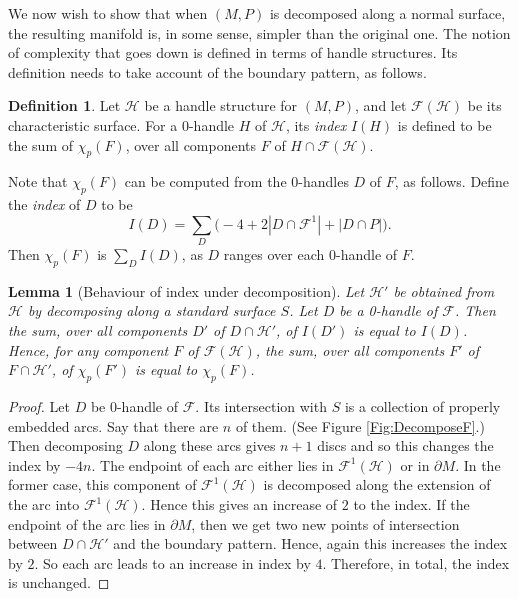 \documentclass[oneside]{amsart}
\numberwithin{equation}{section}
\theoremstyle{plain}
\newtheorem{lemma}[equation]{Lemma}
\theoremstyle{definition}
\newtheorem{definition}[equation]{Definition}
\newcommand{\calF}{\mathcal{F}}
\begin{document}
We now wish to show that when $(M,P)$ is decomposed along a normal surface, the resulting manifold is, in some sense, simpler than the original one. The notion of complexity that goes down is defined in terms of handle structures. Its definition needs to take account of the boundary pattern, as follows.

\begin{definition}
\label{Def:Index}
Let $\mathcal{H}$ be a handle structure for $(M,P)$, and let $\mathcal{F}(\mathcal{H})$ be its characteristic surface.
For a 0-handle $H$ of $\mathcal{H}$, its \emph{index} $I(H)$ is defined to be the sum of $\chi_p(F)$, over all components $F$ of $H \cap \mathcal{F}(\mathcal{H})$.
\end{definition}

Note that $\chi_p(F)$ can be computed from the 0-handles $D$ of $F$, as follows. 
Define the \emph{index} of $D$ to be 
$$I(D) = \sum_D \bigl( -4 + 2|D \cap \mathcal{F}^1| + |D \cap P| \bigr ).$$
Then $\chi_p(F)$ is $\sum_D I(D)$, as $D$ ranges over each 0-handle of $F$.

\begin{lemma}[Behaviour of index under decomposition]
\label{Lem:DecompIndex}
Let $\mathcal{H}'$ be obtained from $\mathcal{ H}$ by decomposing along 
a standard surface $S$. Let $D$ be a 0-handle of $\mathcal{ F}$. Then the sum, over all components
$D'$ of $D \cap \mathcal{ H}'$, of $I(D')$ is equal to $I(D)$. Hence, for any component $F$ of $\mathcal{F}(\mathcal{H})$,
the sum, over all components $F'$ of $F \cap \mathcal{ H}'$, of $\chi_p(F')$ is equal to $\chi_p(F)$.
\end{lemma}

\begin{proof}
Let $D$ be 0-handle of $\calF$. Its intersection with $S$ is a collection of properly embedded arcs. Say that there are $n$ of them. (See Figure \ref{Fig:DecomposeF}.)
Then decomposing $D$ along these arcs gives $n+1$ discs and so this changes the index by $-4n$. The endpoint of each arc either lies in $\mathcal{F}^1(\mathcal{H})$ or in $\partial M$. In the former case, this component of $\mathcal{F}^1(\mathcal{H})$ is decomposed along the extension of the arc into $\mathcal{F}^1(\mathcal{H})$. Hence this gives an increase of $2$ to the index. If the endpoint of the arc lies in $\partial M$, then we get two new points of intersection between $D \cap \mathcal{H}'$ and the boundary pattern. Hence, again this increases the index by $2$. So each arc leads to an increase in index by $4$. Therefore, in total, the index is unchanged.
\end{proof}
\end{document}

